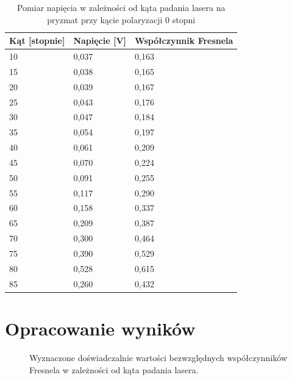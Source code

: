 \documentclass[polish, a4paper]{article}
\begin{document}
\begin{table}[H]
    \centering
    \begin{tabular}{|l|l|l|}
    \hline
        Kąt [stopnie] & Napięcie [V] & Współczynnik Fresnela \\ \hline
        10 & 0,037 & 0,163 \\ \hline
        15 & 0,038 & 0,165 \\ \hline
        20 & 0,039 & 0,167 \\ \hline
        25 & 0,043 & 0,176 \\ \hline
        30 & 0,047 & 0,184 \\ \hline
        35 & 0,054 & 0,197 \\ \hline
        40 & 0,061 & 0,209 \\ \hline
        45 & 0,070 & 0,224 \\ \hline
        50 & 0,091 & 0,255 \\ \hline
        55 & 0,117 & 0,290 \\ \hline
        60 & 0,158 & 0,337 \\ \hline
        65 & 0,209 & 0,387 \\ \hline
        70 & 0,300 & 0,464 \\ \hline
        75 & 0,390 & 0,529 \\ \hline
        80 & 0,528 & 0,615 \\ \hline
        85 & 0,260 & 0,432 \\ \hline
    \end{tabular}
    \caption{Pomiar napięcia w zależności od kąta padania lasera na pryzmat przy kącie polaryzacji 0 stopni}
\end{table}

\section{Opracowanie wyników}

\begin{figure}[H]
\centering
{}
\caption{Wyznaczone doświadczalnie wartości bezwzględnych współczynników Fresnela w zależności od kąta padania lasera.}
\end{figure}
\end{document}
